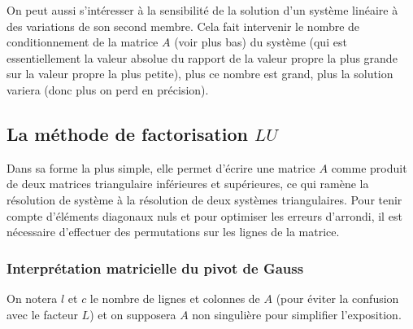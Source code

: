 \documentclass[a4paper,11pt]{article}
\begin{document}
On peut aussi s'intéresser à la sensibilité de la solution d'un
système linéaire à des variations de son second membre. Cela fait intervenir
le nombre de conditionnement de la matrice $A$ (voir plus bas) du système (qui
est essentiellement la valeur absolue du rapport de la valeur propre
la plus grande sur la valeur propre la plus petite), plus
ce nombre est grand, plus la solution variera (donc plus on
perd en précision).

\subsection{La méthode de factorisation $LU$} 
Dans sa forme la plus simple, elle permet d'écrire
une matrice $A$ comme produit de deux matrices triangulaire
inférieures et supérieures, ce qui ram\`ene la résolution
de système à la résolution de deux systèmes triangulaires.
Pour tenir compte d'\'el\'ements diagonaux nuls et pour optimiser 
les erreurs d'arrondi, il est n\'ecessaire d'effectuer des
permutations sur les lignes de la matrice.

\subsubsection{Interpr\'etation matricielle du pivot de Gauss}
On notera $l$ et $c$ le nombre de lignes et colonnes de $A$ (pour
\'eviter la confusion avec le facteur $L$) et on
supposera $A$ non singuli\`ere pour simplifier l'exposition.
\end{document}
